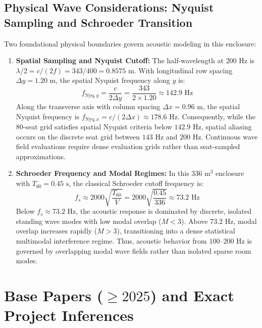 \documentclass[11pt,a4paper]{article}
\begin{document}
\subsection{Physical Wave Considerations: Nyquist Sampling and Schroeder Transition}
Two foundational physical boundaries govern acoustic modeling in this enclosure:
\begin{enumerate}
    \item \textbf{Spatial Sampling and Nyquist Cutoff:} The half-wavelength at $200\text{ Hz}$ is $\lambda / 2 = c / (2 f) = 343 / 400 = 0.8575\text{ m}$. With longitudinal row spacing $\Delta y = 1.20\text{ m}$, the spatial Nyquist frequency along $y$ is:
    \begin{equation}
        f_{\text{Nyq}, y} = \frac{c}{2 \Delta y} = \frac{343}{2 \times 1.20} \approx 142.9\text{ Hz}
    \end{equation}
    Along the transverse axis with column spacing $\Delta x = 0.96\text{ m}$, the spatial Nyquist frequency is $f_{\text{Nyq}, x} = c / (2 \Delta x) \approx 178.6\text{ Hz}$. Consequently, while the 80-seat grid satisfies spatial Nyquist criteria below $142.9\text{ Hz}$, spatial aliasing occurs on the discrete seat grid between $143\text{ Hz}$ and $200\text{ Hz}$. Continuous wave field evaluations require dense evaluation grids rather than seat-sampled approximations.
    \item \textbf{Schroeder Frequency and Modal Regimes:} In this $336\text{ m}^3$ enclosure with $T_{60} = 0.45\text{ s}$, the classical Schroeder cutoff frequency is:
    \begin{equation}
        f_s \approx 2000 \sqrt{\frac{T_{60}}{V}} = 2000 \sqrt{\frac{0.45}{336}} \approx 73.2\text{ Hz}
    \end{equation}
    Below $f_s \approx 73.2\text{ Hz}$, the acoustic response is dominated by discrete, isolated standing wave modes with low modal overlap ($M < 3$). Above $73.2\text{ Hz}$, modal overlap increases rapidly ($M > 3$), transitioning into a dense statistical multimodal interference regime. Thus, acoustic behavior from $100\text{--}200\text{ Hz}$ is governed by overlapping modal wave fields rather than isolated sparse room modes.
\end{enumerate}

\section{Base Papers ($\ge 2025$) and Exact Project Inferences}
\end{document}
